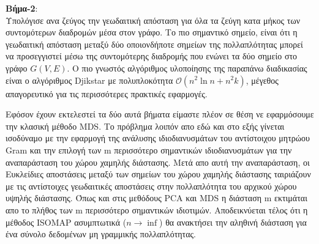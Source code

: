 \par
\textbf{Βήμα-2}: \\ Υπολόγισε ανα ζεύγος την γεωδαιτική απόσταση για όλα τα ζεύγη κατα μήκος των συντομότερων διαδρομών μέσα στον γράφο. Το πιο σημαντικό σημείο, είναι ότι η γεωδαιτική απόσταση μεταξύ δύο οποιονδήποτε σημείων της πολλαπλότητας μπορεί να προσεγγιστεί μέσω της συντομότερης διαδρομής που ενώνει τα δύο σημείο στο γράφο $G(V,E)$. Ο πιο γνωστός αλγόριθμος υλοποίησης της παραπάνω διαδικασίας είναι ο αλγόριθμος \textlatin{Djikstar} με πολυπλοκότητα $\mathcal{O}(n^{2}\ln n + n^{2}k)$, μέγεθος απαγορευτικό για τις περισσότερες πρακτικές εφαρμογές.
\par
Εφόσον έχουν εκτελεστεί τα δύο αυτά βήματα είμαστε πλέον σε θέση νε εφαρμόσουμε την κλασική μέθοδο \textlatin{MDS}. Το πρόβλημα λοιπόν απο εδώ και στο εξής γίνεται ισοδύναμο με την εφαρμογή της ανάλυσης ιδιοδιανυσμάτων του αντίστοιχου μητρώου \textlatin{Gram} και την επιλογή των \textlatin{m} περισσότερο σημαντικών ιδιοδιανυσμάτων για την αναπαράσταση του χώρου χαμηλής διάστασης. Μετά απο αυτή την αναπαράσταση, οι Ευκλείδιες αποστάσεις μεταξύ των σημείων του χώρου χαμηλής διάστασης ταιριάζουν με τις αντίστοιχες γεωδαιτικές αποστάσεις στην πολλαπλότητα του αρχικού χώρου υψηλής διάστασης. Όπως και στις μεθόδους \textlatin{PCA} και \textlatin{MDS} η διάσταση \textlatin{m} εκτιμάται απο το πλήθος των \textlatin{m} περισσότερο σημαντικών ιδιοτιμών. Αποδεικνύεται τέλος ότι η μέθοδος \textlatin{ISOMAP} ασυμπτωτικά ($n \rightarrow \inf$) θα ανακτήσει την αληθινή διάσταση για ένα σύνολο δεδομένων μη γραμμικής πολλαπλότητας.

